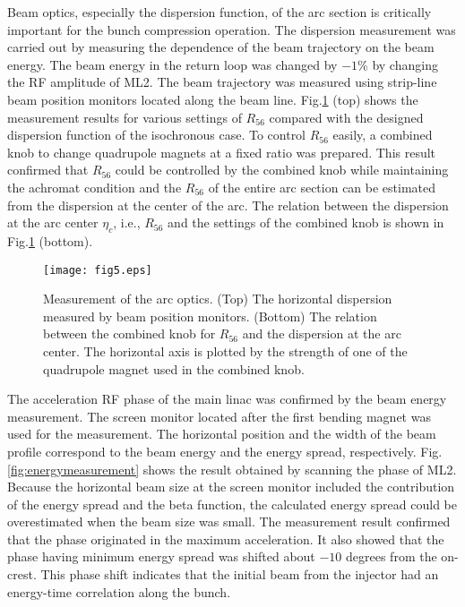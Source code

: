 \documentclass[review]{elsarticle}
\begin{document}
Beam optics, especially the dispersion function,
of the arc section is critically important for the bunch compression operation.
The dispersion measurement was carried out
by measuring the dependence of the beam trajectory on the beam energy.
The beam energy in the return loop was changed by $-1$\%
by changing the RF amplitude of ML2.
The beam trajectory was measured
using strip-line beam position monitors located along the beam line.
Fig.\ref{fig:opticsmeasurement} (top) shows the measurement results for various settings of $R_{56}$
compared with the designed dispersion function of the isochronous case.
To control $R_{56}$ easily,
a combined knob to change quadrupole magnets at a fixed ratio
was prepared.
This result confirmed that
$R_{56}$ could be controlled by the combined knob
while maintaining the achromat condition
and
the $R_{56}$ of the entire arc section
can be estimated from
the dispersion at the center of the arc.
The relation between 
the dispersion at the arc center $\eta_c$, i.e.,  $R_{56}$
and the settings of the combined knob
is shown in Fig.\ref{fig:opticsmeasurement} (bottom).


\begin{figure}[htb]
	\begin{center}
	 \texttt{[image: fig5.eps]}
	 	  \caption{
Measurement of the arc optics.
(Top) 
The horizontal dispersion measured by beam position monitors.
(Bottom)
The relation between the combined knob for $R_{56}$
and the dispersion at the arc center.
The horizontal axis is plotted 
by the strength of one of the quadrupole magnet
used in the combined knob.
}
	\label{fig:opticsmeasurement}
\end{center}
\end{figure}


The acceleration RF phase of the main linac
was confirmed by the beam energy measurement.
The screen monitor located after the first bending magnet
was used for the measurement.
The horizontal position
and the width of the beam profile 
correspond to the beam energy and the energy spread, respectively.
Fig.\ref{fig:energymeasurement} shows the result obtained
by scanning the phase of ML2.
Because the horizontal beam size at the screen monitor
included the contribution of the energy spread and the beta function,
the calculated energy spread could be overestimated 
when the beam size was small.
The measurement result confirmed that 
the phase originated in the maximum acceleration.
It also showed that
the phase having minimum energy spread was shifted about $-10$ degrees
from the on-crest.
This phase shift indicates that the initial beam from the injector
had an energy-time correlation along the bunch.
\end{document}
